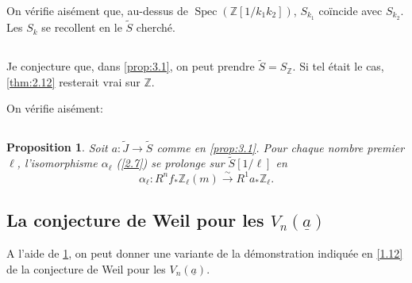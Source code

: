 \documentclass[10pt,leqno]{amsart}
\theoremstyle{plain}
\newtheorem{proposition}[theorem]{Proposition}
\theoremstyle{definition}
\theoremstyle{remark}
\DeclareMathOperator{\Spec}{Spec}
\newcommand{\ZZ}{\mathbb{Z}}
\newcommand{\ua}{\underline{a}}
\begin{document}
On v\'erifie ais\'ement que, au-dessus de $\Spec(\ZZ[1/k_1k_2])$, $S_{k_1}$ co\"incide avec $S_{k_2}$. Les $S_k$ se recollent en le $\tilde{S}$ cherch\'e.

\subsection{}\label{3.3}

Je conjecture que, dans \ref{prop:3.1}, on peut prendre $\tilde{S}=S_\ZZ$. Si tel \'etait le cas, \ref{thm:2.12} resterait vrai sur $\ZZ$.

On v\'erifie ais\'ement:

\subsection{}\label{3.4}

\begin{proposition}\label{prop:3.4}
Soit $a\colon\tilde{J}\to\tilde{S}$ comme en \ref{prop:3.1}. Pour chaque nombre premier $\ell$, l'isomorphisme $\alpha_\ell$ (\ref{2.7}) se prolonge sur $\tilde{S}[1/\ell]$ en
\[
\alpha_\ell\colon R^nf_*\ZZ_\ell(m)\xrightarrow{\sim}R^1a_*\ZZ_\ell.
\]
\end{proposition}

\subsection{La conjecture de Weil pour les $V_n(\ua)$}\label{3.5}

A l'aide de \ref{prop:3.4}, on peut donner une variante de la d\'emonstration indiqu\'ee en \ref{1.12} de la conjecture de Weil pour les $V_n(\ua)$.
\end{document}
